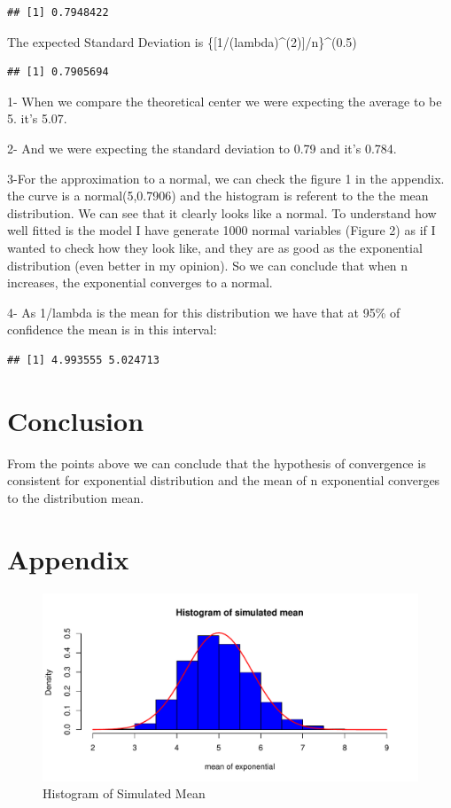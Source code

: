 \documentclass[]{article}
\begin{document}
\begin{verbatim}
## [1] 0.7948422
\end{verbatim}

The expected Standard Deviation is
\{{[}1/(lambda)\^{}(2){]}/n\}\^{}(0.5)

\begin{verbatim}
## [1] 0.7905694
\end{verbatim}

1- When we compare the theoretical center we were expecting the average
to be 5. it's 5.07.

2- And we were expecting the standard deviation to 0.79 and it's 0.784.

3-For the approximation to a normal, we can check the figure 1 in the
appendix. the curve is a normal(5,0.7906) and the histogram is referent
to the the mean distribution. We can see that it clearly looks like a
normal. To understand how well fitted is the model I have generate 1000
normal variables (Figure 2) as if I wanted to check how they look like,
and they are as good as the exponential distribution (even better in my
opinion). So we can conclude that when n increases, the exponential
converges to a normal.

4- As 1/lambda is the mean for this distribution we have that at 95\% of
confidence the mean is in this interval:

\begin{verbatim}
## [1] 4.993555 5.024713
\end{verbatim}

\section{Conclusion}\label{conclusion}

From the points above we can conclude that the hypothesis of convergence
is consistent for exponential distribution and the mean of n exponential
converges to the distribution mean.

\newpage

\section{Appendix}\label{appendix}

\begin{figure}[htbp]
\centering
\includegraphics{TCL_Convergence_files/figure-latex/unnamed-chunk-6-1.pdf}
\caption{Histogram of Simulated Mean}
\end{figure}
\end{document}
